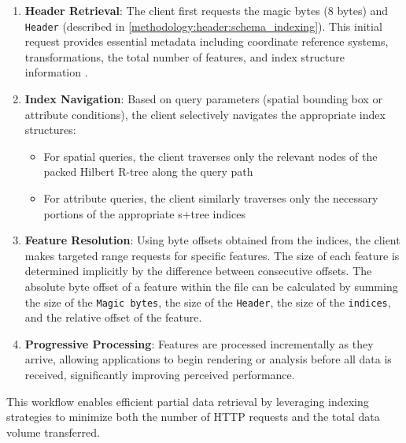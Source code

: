 \begin{enumerate}
  \item \textbf{Header Retrieval}: The client first requests the magic bytes (8 bytes) and \texttt{Header} (described in \autoref{methodology:header:schema_indexing}). This initial request provides essential metadata including coordinate reference systems, transformations, the total number of features, and index structure information \etc.

  \item \textbf{Index Navigation}: Based on query parameters (spatial bounding box or attribute conditions), the client selectively navigates the appropriate index structures:
    \begin{itemize}
      \item For spatial queries, the client traverses only the relevant nodes of the packed Hilbert R-tree along the query path
      \item For attribute queries, the client similarly traverses only the necessary portions of the appropriate \ac{s+tree} indices
    \end{itemize}

  \item \textbf{Feature Resolution}: Using byte offsets obtained from the indices, the client makes targeted range requests for specific features. The size of each feature is determined implicitly by the difference between consecutive offsets. The absolute byte offset of a feature within the file can be calculated by summing the size of the \texttt{Magic bytes}, the size of the \texttt{Header}, the size of the \texttt{indices}, and the relative offset of the feature.

  \item \textbf{Progressive Processing}: Features are processed incrementally as they arrive, allowing applications to begin rendering or analysis before all data is received, significantly improving perceived performance.
\end{enumerate}

This workflow enables efficient partial data retrieval by leveraging indexing strategies to minimize both the number of HTTP requests and the total data volume transferred.

